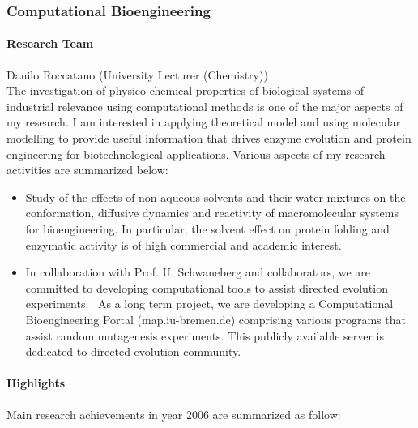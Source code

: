 
\subsubsection{Computational Bioengineering }


\paragraph{Research Team}
Danilo Roccatano (University Lecturer (Chemistry)) \\
The investigation of physico-chemical properties of 
biological  systems of industrial relevance using computational methods 
is one of the major aspects of  my research. I am interested in 
applying theoretical model and using molecular modelling to provide useful information
that drives enzyme evolution and protein engineering for biotechnological applications. Various aspects of my research activities are summarized below:
\begin{itemize}
\item Study of the effects of non-aqueous solvents and their water mixtures on the 
conformation, diffusive dynamics and reactivity of macromolecular systems for 
bioengineering. In particular, the solvent effect on 
protein folding and enzymatic activity is of high commercial and academic interest. 

\item In collaboration with Prof. U. Schwaneberg and collaborators, we are committed to 
developing computational tools to assist directed evolution experiments.~\cite{Wong06,Schenk06,Wong06b}
As a long term project, we are developing a Computational Bioengineering Portal (map.iu-bremen.de)
comprising various programs that assist random mutagenesis experiments. This publicly available server is dedicated to directed evolution community.   


\end{itemize}

\paragraph{Highlights}

Main research achievements in year 2006 are summarized as follow:

